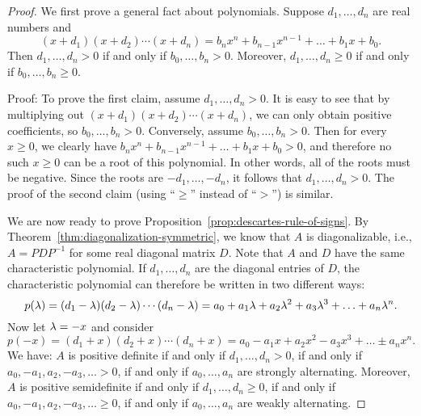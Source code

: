 \begin{proof}
  We first prove a general fact about polynomials. Suppose $d_1,\ldots,d_n$
  are real numbers and
  \begin{equation*}
    (x+d_1)(x+d_2)\cdots(x+d_n) = b_nx^n + b_{n-1}x^{n-1} + \ldots +
    b_1x + b_0.
  \end{equation*}
  Then $d_1,\ldots,d_n > 0$ if and only if $b_0,\ldots,b_n > 0$.
  Moreover, $d_1,\ldots,d_n \geq 0$ if and only if $b_0,\ldots,b_n \geq 0$.

  Proof: To prove the first claim, assume $d_1,\ldots,d_n > 0$. It is
  easy to see that by multiplying out $(x+d_1)(x+d_2)\cdots(x+d_n)$,
  we can only obtain positive coefficients, so $b_0,\ldots,b_n >
  0$. Conversely, assume $b_0,\ldots,b_n > 0$. Then for every
  $x\geq 0$, we clearly have $b_nx^n + b_{n-1}x^{n-1} + \ldots + b_1x + b_0 >
  0$, and therefore no such $x\geq 0$ can be a root of this
  polynomial.  In other words, all of the roots must be
  negative. Since the roots are $-d_1,\ldots,-d_n$, it follows that
  $d_1,\ldots,d_n>0$. The proof of the second claim (using ``$\geq$''
  instead of ``$>$'') is similar.
  
  We are now ready to prove
  Proposition~\ref{prop:descartes-rule-of-signs}. By
  Theorem~\ref{thm:diagonalization-symmetric}, we know that $A$ is
  diagonalizable, i.e., $A=PDP^{-1}$ for some real diagonal matrix
  $D$. Note that $A$ and $D$ have the same characteristic
  polynomial. If $d_1,\ldots,d_n$ are the diagonal entries of $D$, the
  characteristic polynomial can therefore be written in two different
  ways:
  \begin{equation*}
    p(\lambda)
    = (d_1-\lambda)(d_2-\lambda)\cdots(d_n-\lambda)
    = a_0 + a_1\lambda + a_2\lambda^2 + a_3\lambda^3 + \ldots + a_n\lambda^n.
  \end{equation*}
  Now let $\lambda=-x$ and consider
  \begin{equation*}
    p(-x) = (d_1+x)(d_2+x)\cdots(d_n+x)
    = a_0 - a_1 x + a_2 x^2 - a_3x^3 + \ldots \pm a_n x^n.
  \end{equation*}
  We have: $A$ is positive definite if and only if $d_1,\ldots,d_n>0$,
  if and only if $a_0,-a_1,a_2,-a_3,\ldots > 0$, if and only if
  $a_0,\ldots,a_n$ are strongly alternating.  Moreover, $A$ is
  positive semidefinite if and only if $d_1,\ldots,d_n\geq 0$, if and
  only if $a_0,-a_1,a_2,-a_3,\ldots \geq 0$, if and only if
  $a_0,\ldots,a_n$ are weakly alternating.
\end{proof}

